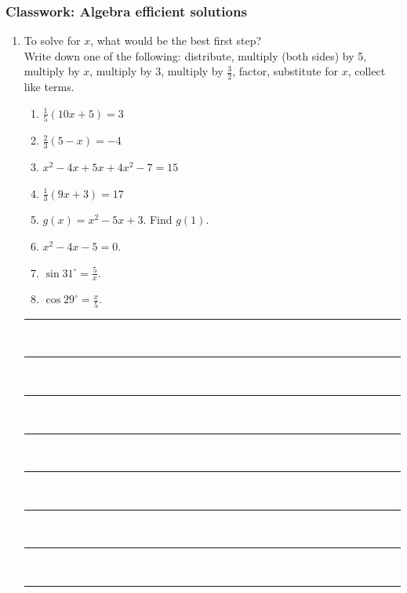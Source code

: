 \documentclass[12pt, twoside]{article}
\begin{document}
\begin{enumerate}
\end{enumerate}

\newpage

\subsubsection*{Classwork: Algebra efficient solutions}
\begin{enumerate}
\item To solve for $x$, what would be the best first step? \\[0.5cm]
Write down one of the following: distribute, multiply (both sides) by 5, multiply by $x$, multiply by 3, multiply by $\frac{3}{2}$, factor, substitute for $x$, collect like terms. \vspace{0.5cm}
\begin{multicols}{2}
  \raggedcolumns
  \begin{enumerate}
\item   $\frac{1}{5}(10x+5)=3$ \vspace{0.5cm}
\item   $\frac{2}{3}(5-x)=-4$ \vspace{0.5cm}
\item $x^2-4x+5x+4x^2-7=15$ \vspace{0.5cm}
\item $\frac{1}{3}(9x+3)=17$ \vspace{0.5cm}
\item $g(x)=x^2-5x+3$. Find $g(1)$. \vspace{0.5cm}
\item $x^2-4x-5=0$. \vspace{0.5cm}
\item $\displaystyle \sin 31^\circ = \frac{5}{x}$. \vspace{0.5cm}
\item $\displaystyle \cos 29^\circ = \frac{x}{5}$. \vspace{0.5cm}


\end{enumerate}
  \rule{6cm}{0.15mm} \\[0.75cm]
  \rule{6cm}{0.15mm} \\[0.75cm]
  \rule{6cm}{0.15mm} \\[0.75cm]
  \rule{6cm}{0.15mm} \\[0.75cm]
  \rule{6cm}{0.15mm} \\[0.75cm]
  \rule{6cm}{0.15mm} \\[0.75cm]
  \rule{6cm}{0.15mm} \\[0.75cm]
  \rule{6cm}{0.15mm}


\end{multicols}
\end{enumerate}
\end{document}
